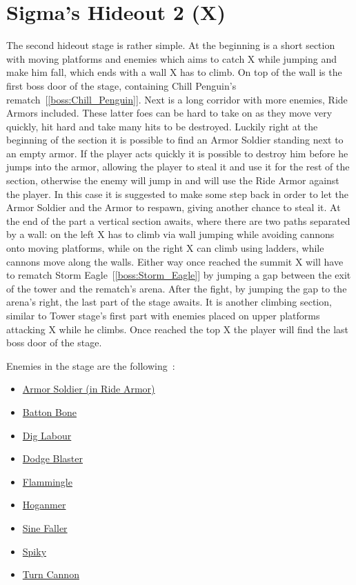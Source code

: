 \section{Sigma's Hideout 2 (X)}
The second hideout stage is rather simple. At the beginning is a short section with moving platforms and enemies which aims to catch X while jumping and make him fall, which ends with a wall X has to climb. On top of the wall is the first boss door of the stage, containing Chill Penguin's rematch~[\ref{boss:Chill_Penguin}]. Next is a long corridor with more enemies, Ride Armors included. These latter foes can be hard to take on as they move very quickly, hit hard and take many hits to be destroyed. Luckily right at the beginning of the section it is possible to find an Armor Soldier standing next to an empty armor. If the player acts quickly it is possible to destroy him before he jumps into the armor, allowing the player to steal it and use it for the rest of the section, otherwise the enemy will jump in and will use the Ride Armor against the player. In this case it is suggested to make some step back in order to let the Armor Soldier and the Armor to respawn, giving another chance to steal it. At the end of the part a vertical section awaits, where there are two paths separated by a wall: on the left X has to climb via wall jumping while avoiding cannons onto moving platforms, while on the right X can climb using ladders, while cannons move along the walls. Either way once reached the summit X will have to rematch Storm Eagle~[\ref{boss:Storm_Eagle}] by jumping a gap between the exit of the tower and the rematch's arena. After the fight, by jumping the gap to the arena's right, the last part of the stage awaits. It is another climbing section, similar to Tower stage's first part with enemies placed on upper platforms attacking X while he climbs. Once reached the top X the player will find the last boss door of the stage.

Enemies in the stage are the following~\cite{wiki:sigma_stages}:
\begin{itemize}
	\item \hyperlink{enem:Armor_Soldier}{Armor Soldier (in Ride Armor)}
	\item \hyperlink{enem:Batton_Bone}{Batton Bone}
	\item \hyperlink{enem:Dig_Labour}{Dig Labour}
	\item \hyperlink{enem:Dodge_Blaster}{Dodge Blaster}
	\item \hyperlink{enem:Flammingle}{Flammingle}
	\item \hyperlink{enem:Hoganmer}{Hoganmer}
	\item \hyperlink{enem:Sine_Faller}{Sine Faller}
	\item \hyperlink{enem:Spiky}{Spiky}
	\item \hyperlink{enem:Turn_Cannon}{Turn Cannon}
\end{itemize} 

